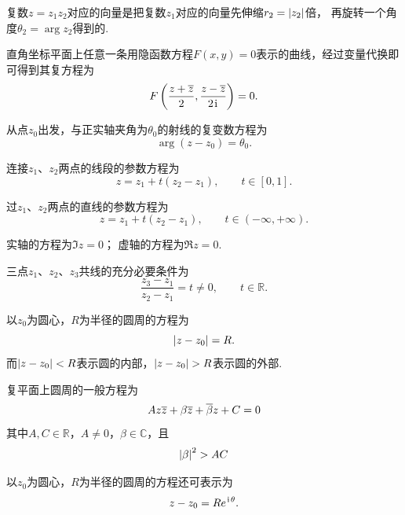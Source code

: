 复数\(z=z_1 z_2\)对应的向量是把复数\(z_1\)对应的向量先伸缩\(r_2 = \abs{z_2}\)倍，
再旋转一个角度\(\theta_2 = \arg z_2\)得到的.

直角坐标平面上任意一条用隐函数方程\(F(x,y)=0\)表示的曲线，经过变量代换即可得到其复方程为\begin{equation*}
F\left(\frac{z+\overline{z}}{2},\frac{z-\overline{z}}{2\kern1pt\mathrm{i}\kern1pt}\right)=0.
\end{equation*}

\begin{example}%
从点\(z_0\)出发，与正实轴夹角为\(\theta_0\)的射线的复变数方程为\begin{equation*}
\arg(z-z_0) = \theta_0.
\end{equation*}
\end{example}

\begin{example}%
连接\(z_1\)、\(z_2\)两点的线段的参数方程为\begin{equation*}
z = z_1 + t(z_2 - z_1), \qquad t \in [0,1].
\end{equation*}
\end{example}

\begin{example}%
过\(z_1\)、\(z_2\)两点的直线的参数方程为\begin{equation*}
z = z_1 + t(z_2 - z_1), \qquad t \in (-\infty,+\infty).
\end{equation*}

实轴的方程为\(\Im z = 0\)；
虚轴的方程为\(\Re z = 0\).
\end{example}

\begin{example}%
三点\(z_1\)、\(z_2\)、\(z_3\)共线的充分必要条件为\begin{equation*}
\frac{z_3 - z_1}{z_2 - z_1} = t \neq 0, \qquad t \in \mathbb{R}.
\end{equation*}
\end{example}

\begin{example}%
以\(z_0\)为圆心，\(R\)为半径的圆周的方程为\begin{equation*}
\abs{z - z_0} = R.
\end{equation*}而\(\abs{z-z_0}<R\)表示圆的内部，\(\abs{z-z_0}>R\)表示圆的外部.

复平面上圆周的一般方程为\begin{equation*}
A z \overline{z} + \beta \overline{z} + \overline{\beta} z + C = 0
\end{equation*}其中\(A,C\in\mathbb{R}\)，\(A \neq 0\)，\(\beta\in\mathbb{C}\)，且\begin{equation*}
\abs{\beta}^2 > AC
\end{equation*}

以\(z_0\)为圆心，\(R\)为半径的圆周的方程还可表示为\begin{equation*}
z - z_0 = R e^{\kern1pt\mathrm{i}\kern1pt \theta}.
\end{equation*}
\end{example}


